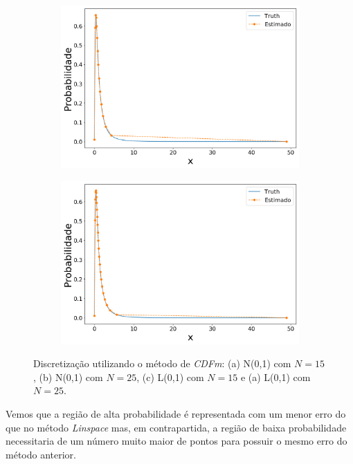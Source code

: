 \begin{figure}[H]
	
	\begin{subfigure}[b]{0.45\textwidth}
		\centering 
		\includegraphics[width=\linewidth]{./figuras/CDFm_lognormal_15}
		\caption{}
		\label{fig:cdf_log15}
	\end{subfigure}
	\hfill
	\begin{subfigure}[b]{0.45\textwidth}
		\centering 
		\includegraphics[width=\linewidth]{./figuras/CDFm_lognormal_25}
		\caption{}
		\label{fig:cdf_log25}
	\end{subfigure}
	
	\caption{Discretização utilizando o método de \textit{CDFm}: (a) N(0,1) com $N = 15$, (b) N(0,1) com $N = 25$, (c) L(0,1) com $N = 15$ e (a) L(0,1) com $N = 25$.}
	\label{fig:cdfnorm}
\end{figure}

Vemos que a região de alta probabilidade é representada com um menor erro do que no método \textit{Linspace} mas, em contrapartida, a região de baixa probabilidade necessitaria de um número muito maior de pontos para possuir o mesmo erro do método anterior.

